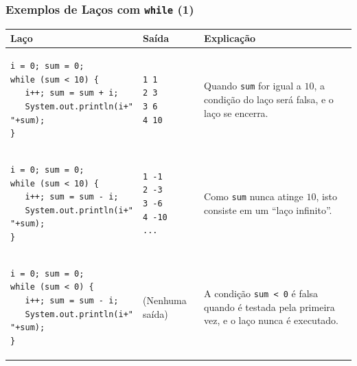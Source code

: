 \documentclass[xcolor={dvipsnames,table},aspectratio=169]{beamer}
\begin{document}
\begin{frame}[fragile]\frametitle{Exemplos de Laços com \texttt{while} (1)}
{\scriptsize
\begin{center}
  \begin{tabular}{|p{6cm}|p{2cm}|p{5cm}|}
\hline
    \textbf{Laço} & \textbf{Saída} & \textbf{Explicação} \\
\hline
{\tiny
\begin{verbatim}
i = 0; sum = 0;
while (sum < 10) {
   i++; sum = sum + i;
   System.out.println(i+" "+sum);
}
\end{verbatim}
}
&
{\tiny
\begin{verbatim}
1 1
2 3
3 6
4 10
\end{verbatim}
}
& Quando \texttt{sum} for igual a $10$, a condição do laço será falsa, e o laço se encerra.\\
\hline
{\tiny
\begin{verbatim}
i = 0; sum = 0;
while (sum < 10) {
   i++; sum = sum - i;
   System.out.println(i+" "+sum);
}
\end{verbatim}
}
&
{\tiny
\begin{verbatim}
1 -1
2 -3
3 -6
4 -10
...
\end{verbatim}
}
& Como \texttt{sum} nunca atinge $10$, isto consiste em um ``laço infinito''.\\
\hline
{\tiny
\begin{verbatim}
i = 0; sum = 0;
while (sum < 0) {
   i++; sum = sum - i;
   System.out.println(i+" "+sum);
}
\end{verbatim}
}
&
(Nenhuma saída)
& A condição \texttt{sum < 0} é falsa quando é testada pela primeira vez, e o laço nunca é executado.\\
\hline
  \end{tabular}
\end{center}
}
\end{frame}
\end{document}

